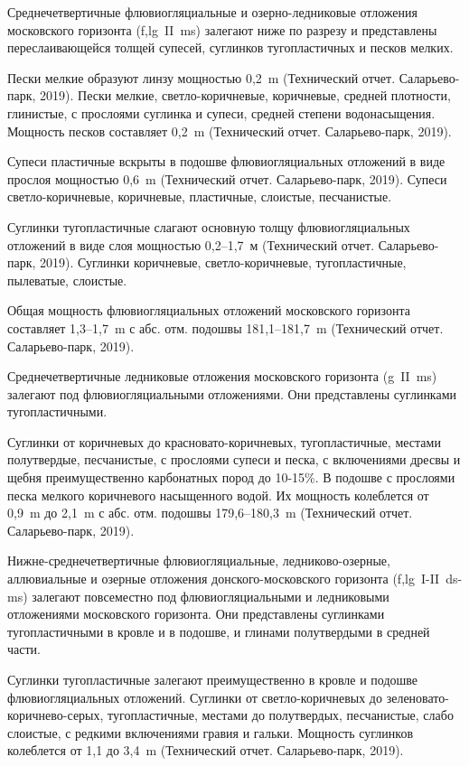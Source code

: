 Среднечетвертичные флювиогляциальные и озерно-ледниковые отложения московского горизонта 
(f,lg~II~ms) залегают ниже по разрезу и представлены переслаивающейся толщей супесей, суглинков 
тугопластичных и песков мелких.

Пески мелкие образуют линзу мощностью 0,2~\si{\meter} (Технический отчет. Саларьево-парк, 2019). Пески мелкие, светло-коричневые, 
коричневые, средней плотности, глинистые, с прослоями суглинка и супеси, средней степени водонасыщения. 
Мощность песков составляет 0,2~\si{\meter} (Технический отчет. Саларьево-парк, 2019).

Супеси пластичные вскрыты в подошве флювиогляциальных отложений в виде прослоя 
мощностью 0,6~\si{\meter} (Технический отчет. Саларьево-парк, 2019). 
Супеси светло-коричневые, коричневые, пластичные, слоистые, песчанистые.

Суглинки тугопластичные слагают основную толщу флювиогляциальных отложений в виде 
слоя мощностью 0,2--1,7~м (Технический отчет. Саларьево-парк, 2019). 
Суглинки коричневые, светло-коричневые, тугопластичные, пылеватые, слоистые.

Общая мощность флювиогляциальных отложений московского горизонта составляет 
1,3--1,7~\si{\meter} с абс. отм. подошвы 181,1--181,7~\si{\meter} 
(Технический отчет. Саларьево-парк, 2019).

Среднечетвертичные ледниковые отложения московского горизонта (g~II~ms) 
залегают под флювиогляциальными отложениями. 
Они представлены суглинками тугопластичными.

Суглинки от коричневых до красновато-коричневых, тугопластичные, местами полутвердые, 
песчанистые, с прослоями супеси и песка, с включениями дресвы и щебня преимущественно 
карбонатных пород до 10-15\%. В подошве с прослоями песка мелкого коричневого 
насыщенного водой. 
Их мощность колеблется от 0,9~\si{\meter} до 2,1~\si{\meter} с абс. отм. 
подошвы 179,6--180,3~\si{\meter} (Технический отчет. Саларьево-парк, 2019).

Нижне-среднечетвертичные флювиогляциальные, ледниково-озерные, аллювиальные и 
озерные отложения донского-московского горизонта (f,lg~I-II~ds-ms) залегают 
повсеместно под флювиогляциальными и ледниковыми отложениями московского горизонта. 
Они представлены суглинками тугопластичными в кровле и в подошве, 
и глинами полутвердыми в средней части.

Суглинки тугопластичные залегают преимущественно в кровле и подошве флювиогляциальных отложений.
Суглинки от светло-коричневых до зеленовато-коричнево-серых, тугопластичные, 
местами до полутвердых, песчанистые, слабо слоистые, с редкими включениями гравия и гальки. 
Мощность суглинков колеблется от 1,1 до 3,4~\si{\meter} (Технический отчет. Саларьево-парк, 2019).

